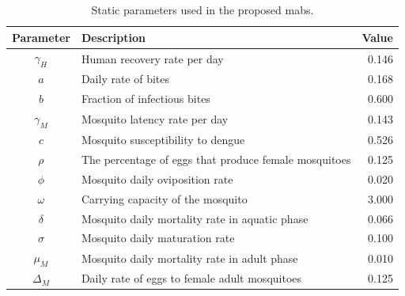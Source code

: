 \begin{table}[!ht]
	\centering
	\caption{\label{tab:parameters-mabs} Static parameters used in the proposed
		\gls{mabs}.} \small{%
		\begin{tabular}{clr}
			\toprule
			\textbf{Parameter} & \textbf{Description}                                  & \textbf{Value} \\ \midrule
			$\gamma_H$         & Human recovery rate per day                           & 0.146          \\ \hline
			$a$                & Daily rate of bites                                   & 0.168          \\ \hline
			$b$                & Fraction of infectious bites                          & 0.600          \\ \hline
			$\gamma_M$         & Mosquito latency rate per day                         & 0.143          \\ \hline
			$c$                & Mosquito susceptibility to dengue                     & 0.526          \\ \hline
			$\rho$             & The percentage of eggs that produce female mosquitoes & 0.125
			\\ \hline
			$\phi$             & Mosquito daily oviposition rate                       & 0.020          \\ \hline
			$\omega$           & Carrying capacity of the mosquito                     & 3.000          \\
			\hline
			$\delta$           & Mosquito daily mortality rate in aquatic phase        & 0.066          \\ \hline
			$\sigma$           & Mosquito daily maturation rate                        & 0.100          \\ \hline
			$\mu_M$            & Mosquito daily mortality rate in adult phase          & 0.010
			\\ \hline
			$\Delta_M$         & Daily rate of eggs to female adult mosquitoes         &
			0.125                                                                                       \\
			\bottomrule
		\end{tabular}%
	}
\end{table}

